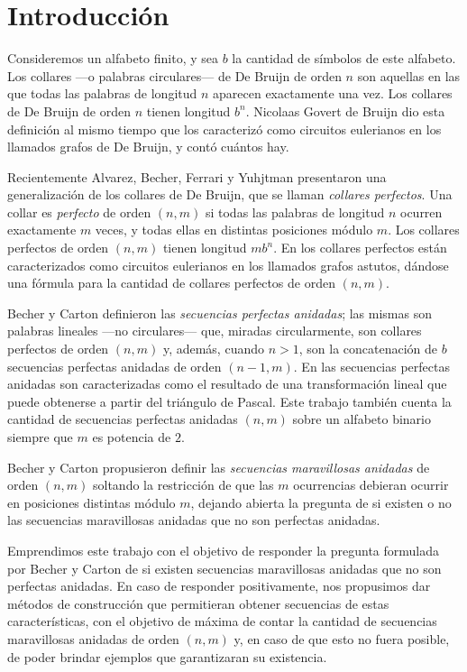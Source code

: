 \chapter{Introducción}

Consideremos un alfabeto finito, y sea $b$ la
cantidad de símbolos de este alfabeto.
Los collares ---o palabras circulares--- de
De Bruijn de orden $n$ son aquellas en las que todas las palabras de longitud
$n$ aparecen exactamente una vez.
Los collares de De Bruijn de orden $n$ tienen longitud $b^n$.
Nicolaas Govert de Bruijn \cite{de-bruijn-combinatorial-problem}
dio esta definición al mismo tiempo que los caracterizó como circuitos eulerianos
en los llamados grafos de De Bruijn, y contó cuántos hay.

Recientemente Alvarez, Becher, Ferrari y Yuhjtman \cite{alvarez-perfect-necklaces}
presentaron una generalización de los collares de De Bruijn,
que se llaman \emph{collares perfectos}.
Una collar es \emph{perfecto} de orden $(n,m)$ si todas las palabras 
de longitud $n$ ocurren exactamente $m$ veces, y todas ellas en distintas
posiciones módulo $m$.
Los collares perfectos de orden $(n,m)$ tienen longitud $mb^n$.
En \cite{alvarez-perfect-necklaces} los collares perfectos están
caracterizados como circuitos eulerianos en los llamados grafos astutos,
dándose una fórmula para la cantidad de collares perfectos de orden $(n,m)$.

Becher y Carton \cite{becher-nested-perfect} definieron las
\emph{secuencias perfectas anidadas}; las mismas son palabras lineales ---no
circulares--- que, miradas circularmente, son collares perfectos de orden $(n,m)$
y, además, cuando $n>1$, son la concatenación de $b$ secuencias perfectas
anidadas de orden $(n-1, m)$.
En \cite{becher-nested-perfect} las secuencias perfectas anidadas son
caracterizadas como el resultado de una transformación lineal que puede
obtenerse a partir del triángulo de Pascal. Este trabajo también cuenta la
cantidad de secuencias perfectas anidadas $(n,m)$ sobre un alfabeto binario
siempre que $m$ es potencia de $2$.

Becher y Carton propusieron definir las \emph{secuencias maravillosas anidadas}
de orden $(n,m)$ soltando la restricción de que las $m$ ocurrencias debieran
ocurrir en posiciones distintas módulo $m$, dejando abierta la pregunta de si
existen o no las secuencias maravillosas anidadas que no son perfectas anidadas.

\medskip

Emprendimos este trabajo con el objetivo de responder la pregunta formulada por
Becher y Carton de si existen secuencias maravillosas anidadas que no son
perfectas anidadas.
En caso de responder positivamente, nos propusimos dar métodos de construcción
que permitieran obtener secuencias de estas características, con el objetivo
de máxima de contar la cantidad de secuencias maravillosas anidadas de orden
$(n,m)$ y, en caso de que esto no fuera posible, de poder brindar ejemplos que
garantizaran su existencia.

